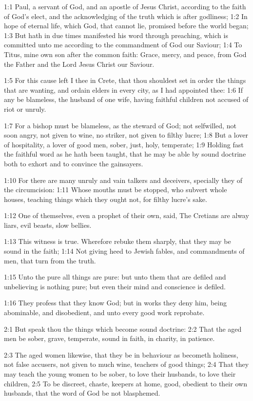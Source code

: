 

1:1 Paul, a servant of God, and an apostle of Jesus Christ, according to the faith of God's elect, and the acknowledging of the truth which is after godliness; 1:2 In hope of eternal life, which God, that cannot lie, promised before the world began; 1:3 But hath in due times manifested his word through preaching, which is committed unto me according to the commandment of God our Saviour; 1:4 To Titus, mine own son after the common faith: Grace, mercy, and peace, from God the Father and the Lord Jesus Christ our Saviour.

1:5 For this cause left I thee in Crete, that thou shouldest set in order the things that are wanting, and ordain elders in every city, as I had appointed thee: 1:6 If any be blameless, the husband of one wife, having faithful children not accused of riot or unruly.

1:7 For a bishop must be blameless, as the steward of God; not selfwilled, not soon angry, not given to wine, no striker, not given to filthy lucre; 1:8 But a lover of hospitality, a lover of good men, sober, just, holy, temperate; 1:9 Holding fast the faithful word as he hath been taught, that he may be able by sound doctrine both to exhort and to convince the gainsayers.

1:10 For there are many unruly and vain talkers and deceivers, specially they of the circumcision: 1:11 Whose mouths must be stopped, who subvert whole houses, teaching things which they ought not, for filthy lucre's sake.

1:12 One of themselves, even a prophet of their own, said, The Cretians are alway liars, evil beasts, slow bellies.

1:13 This witness is true. Wherefore rebuke them sharply, that they may be sound in the faith; 1:14 Not giving heed to Jewish fables, and commandments of men, that turn from the truth.

1:15 Unto the pure all things are pure: but unto them that are defiled and unbelieving is nothing pure; but even their mind and conscience is defiled.

1:16 They profess that they know God; but in works they deny him, being abominable, and disobedient, and unto every good work reprobate.

2:1 But speak thou the things which become sound doctrine: 2:2 That the aged men be sober, grave, temperate, sound in faith, in charity, in patience.

2:3 The aged women likewise, that they be in behaviour as becometh holiness, not false accusers, not given to much wine, teachers of good things; 2:4 That they may teach the young women to be sober, to love their husbands, to love their children, 2:5 To be discreet, chaste, keepers at home, good, obedient to their own husbands, that the word of God be not blasphemed.

